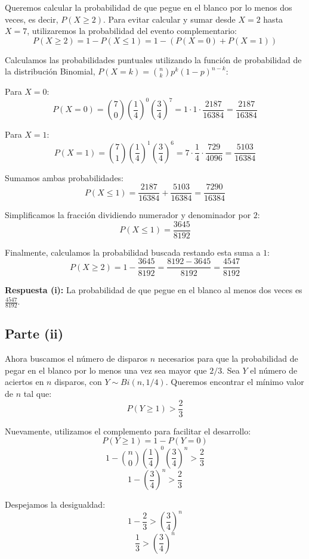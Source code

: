 \documentclass[11pt, a4paper]{article}
\begin{document}
Queremos calcular la probabilidad de que pegue en el blanco por lo menos dos veces, es decir, $P(X \ge 2)$. Para evitar calcular y sumar desde $X=2$ hasta $X=7$, utilizaremos la probabilidad del evento complementario:
\[ P(X \ge 2) = 1 - P(X \le 1) = 1 - \left( P(X = 0) + P(X = 1) \right) \]

Calculamos las probabilidades puntuales utilizando la función de probabilidad de la distribución Binomial, $P(X = k) = \binom{n}{k} p^k (1-p)^{n-k}$:

Para $X = 0$:
\[ P(X = 0) = \binom{7}{0} \left(\frac{1}{4}\right)^0 \left(\frac{3}{4}\right)^7 = 1 \cdot 1 \cdot \frac{2187}{16384} = \frac{2187}{16384} \]

Para $X = 1$:
\[ P(X = 1) = \binom{7}{1} \left(\frac{1}{4}\right)^1 \left(\frac{3}{4}\right)^6 = 7 \cdot \frac{1}{4} \cdot \frac{729}{4096} = \frac{5103}{16384} \]

Sumamos ambas probabilidades:
\[ P(X \le 1) = \frac{2187}{16384} + \frac{5103}{16384} = \frac{7290}{16384} \]

Simplificamos la fracción dividiendo numerador y denominador por $2$:
\[ P(X \le 1) = \frac{3645}{8192} \]

Finalmente, calculamos la probabilidad buscada restando esta suma a $1$:
\[ P(X \ge 2) = 1 - \frac{3645}{8192} = \frac{8192 - 3645}{8192} = \frac{4547}{8192} \]

\textbf{Respuesta (i):} La probabilidad de que pegue en el blanco al menos dos veces es $\frac{4547}{8192}$.

\vspace{0.5cm}

\subsection*{Parte (ii)}

Ahora buscamos el número de disparos $n$ necesarios para que la probabilidad de pegar en el blanco por lo menos una vez sea mayor que $2/3$.
Sea $Y$ el número de aciertos en $n$ disparos, con $Y \sim Bi(n, 1/4)$. Queremos encontrar el mínimo valor de $n$ tal que:
\[ P(Y \ge 1) > \frac{2}{3} \]

Nuevamente, utilizamos el complemento para facilitar el desarrollo:
\[ P(Y \ge 1) = 1 - P(Y = 0) \]
\[ 1 - \binom{n}{0} \left(\frac{1}{4}\right)^0 \left(\frac{3}{4}\right)^n > \frac{2}{3} \]
\[ 1 - \left(\frac{3}{4}\right)^n > \frac{2}{3} \]

Despejamos la desigualdad:
\[ 1 - \frac{2}{3} > \left(\frac{3}{4}\right)^n \]
\[ \frac{1}{3} > \left(\frac{3}{4}\right)^n \]
\end{document}
